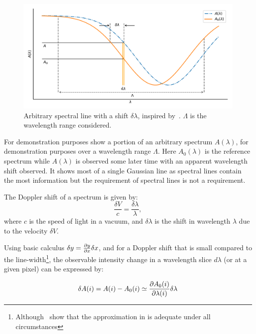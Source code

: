 \begin{figure}
    \centering
    \includegraphics[width=0.7\linewidth]{figures/information-content/precision_plot.pdf}
    \caption{Arbitrary spectral line with a shift \(\delta \lambda\), inspired by~\citet{connes_absolute_1985}.  \(\Lambda\) is the wavelength range considered.}
    \label{fig:precisionderivation}
\end{figure}

For demonstration purposes   show a portion of an arbitrary spectrum \(A(\lambda)\), for demonstration purposes over a wavelength range \(\Lambda\). Here \(A_0(\lambda)\) is the reference spectrum while \(A(\lambda)\) is observed some later time with an apparent wavelength shift observed. It shows most of a single Gaussian line as spectral lines contain the most information but the requirement of spectral lines is not a requirement.

The Doppler shift of a spectrum is given by:
\begin{equation}
\frac{\delta V}{c} = \frac{\delta \lambda}{\lambda},
\label{eq:dopplershift}
\end{equation}
where \(c\) is the speed of light in a vacuum, and \(\delta \lambda\) is the shift in wavelength \(\lambda\) due to the velocity \(\delta V\).


Using basic calculus \(\delta y = \frac{\partial{y}}{\partial{x}} \delta x \nonumber\), and for a Doppler shift that is small compared to the line-width\footnote{Although~\citet{connes_absolute_1985} show that the approximation in  is adequate under all circumstances}, the observable intensity change in a wavelength slice \(d \lambda\) (or at a given pixel) can be expressed by:

\begin{equation}
\delta A(i) = A(i) - A_0(i) \simeq \frac{\partial{A_0(i)}}{\partial{\lambda(i)}} \delta \lambda
\label{eq:intensitychange}
\end{equation}

